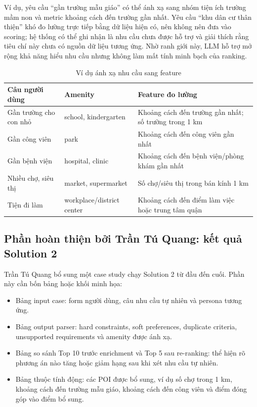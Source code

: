 \documentclass[a4paper,12pt]{article}
\begin{document}
Ví dụ, yêu cầu ``gần trường mẫu giáo'' có thể ánh xạ sang nhóm tiện ích trường mầm non và metric khoảng cách đến trường gần nhất. Yêu cầu ``khu dân cư thân thiện'' khó đo lường trực tiếp bằng dữ liệu hiện có, nên không nên đưa vào scoring; hệ thống có thể ghi nhận là nhu cầu chưa được hỗ trợ và giải thích rằng tiêu chí này chưa có nguồn dữ liệu tương ứng. Nhờ ranh giới này, LLM hỗ trợ mở rộng khả năng hiểu nhu cầu nhưng không làm mất tính minh bạch của ranking.

\begin{table}[H]
\centering
\caption{Ví dụ ánh xạ nhu cầu sang feature}
\label{tab:amenity_mapping}
\small
\begin{tabularx}{\textwidth}{|P{4.3cm}|P{3.0cm}|Y|}
\hline
\textbf{Câu người dùng} & \textbf{Amenity} & \textbf{Feature đo lường} \\ \hline
Gần trường cho con nhỏ & school, kindergarten & Khoảng cách đến trường gần nhất; số trường trong 1 km \\ \hline
Gần công viên & park & Khoảng cách đến công viên gần nhất \\ \hline
Gần bệnh viện & hospital, clinic & Khoảng cách đến bệnh viện/phòng khám gần nhất \\ \hline
Nhiều chợ, siêu thị & market, supermarket & Số chợ/siêu thị trong bán kính 1 km \\ \hline
Tiện đi làm & workplace/district center & Khoảng cách đến điểm làm việc hoặc trung tâm quận \\ \hline
\end{tabularx}
\end{table}

\subsection{Phần hoàn thiện bởi Trần Tú Quang: kết quả Solution 2}
Trần Tú Quang bổ sung một case study chạy Solution 2 từ đầu đến cuối. Phần này cần bốn bảng hoặc khối minh họa:

\begin{itemize}
    \item Bảng input case: form người dùng, câu nhu cầu tự nhiên và persona tương ứng.
    \item Bảng output parser: hard constraints, soft preferences, duplicate criteria, unsupported requirements và amenity được ánh xạ.
    \item Bảng so sánh Top 10 trước enrichment và Top 5 sau re-ranking: thể hiện rõ phương án nào tăng hoặc giảm hạng sau khi xét nhu cầu tự nhiên.
    \item Bảng thuộc tính động: các POI được bổ sung, ví dụ số chợ trong 1 km, khoảng cách đến trường mẫu giáo, khoảng cách đến công viên và điểm đóng góp vào điểm bổ sung.
\end{itemize}
\end{document}
